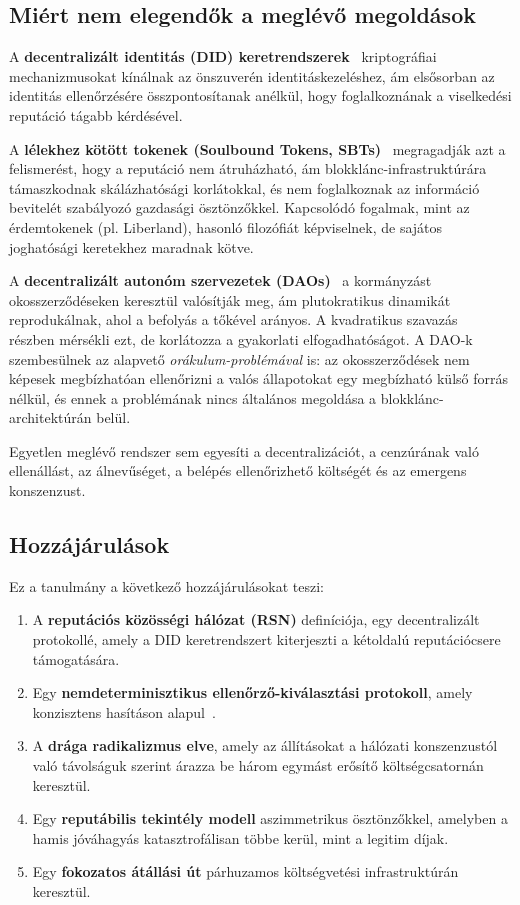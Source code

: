\documentclass[11pt,a4paper,twocolumn]{article}
\begin{document}
\subsection{Miért nem elegendők a meglévő megoldások}

A \textbf{decentralizált identitás (DID) keretrendszerek}~\cite{did2022} kriptográfiai mechanizmusokat kínálnak az önszuverén identitáskezeléshez, ám elsősorban az identitás ellenőrzésére összpontosítanak anélkül, hogy foglalkoznának a viselkedési reputáció tágabb kérdésével.

A \textbf{lélekhez kötött tokenek (Soulbound Tokens, SBTs)}~\cite{weyl2022} megragadják azt a felismerést, hogy a reputáció nem átruházható, ám blokklánc-infrastruktúrára támaszkodnak skálázhatósági korlátokkal, és nem foglalkoznak az információ bevitelét szabályozó gazdasági ösztönzőkkel. Kapcsolódó fogalmak, mint az érdemtokenek (pl. Liberland), hasonló filozófiát képviselnek, de sajátos joghatósági keretekhez maradnak kötve.

A \textbf{decentralizált autonóm szervezetek (DAOs)}~\cite{buterin2014} a kormányzást okosszerződéseken keresztül valósítják meg, ám plutokratikus dinamikát reprodukálnak, ahol a befolyás a tőkével arányos. A kvadratikus szavazás~\cite{buterin2019} részben mérsékli ezt, de korlátozza a gyakorlati elfogadhatóságot. A DAO-k szembesülnek az alapvető \emph{orákulum-problémával} is: az okosszerződések nem képesek megbízhatóan ellenőrizni a valós állapotokat egy megbízható külső forrás nélkül, és ennek a problémának nincs általános megoldása a blokklánc-architektúrán belül.

Egyetlen meglévő rendszer sem egyesíti a decentralizációt, a cenzúrának való ellenállást, az álnevűséget, a belépés ellenőrizhető költségét és az emergens konszenzust.

\subsection{Hozzájárulások}

Ez a tanulmány a következő hozzájárulásokat teszi:
\begin{enumerate}[nosep]
\item A \textbf{reputációs közösségi hálózat (RSN)} definíciója, egy decentralizált protokollé, amely a DID keretrendszert kiterjeszti a kétoldalú reputációcsere támogatására.
\item Egy \textbf{nemdeterminisztikus ellenőrző-kiválasztási protokoll}, amely konzisztens hasításon alapul~\cite{karger1997}.
\item A \textbf{drága radikalizmus elve}, amely az állításokat a hálózati konszenzustól való távolságuk szerint árazza be három egymást erősítő költségcsatornán keresztül.
\item Egy \textbf{reputábilis tekintély modell} aszimmetrikus ösztönzőkkel, amelyben a hamis jóváhagyás katasztrofálisan többe kerül, mint a legitim díjak.
\item Egy \textbf{fokozatos átállási út} párhuzamos költségvetési infrastruktúrán keresztül.
\end{enumerate}
\end{document}
